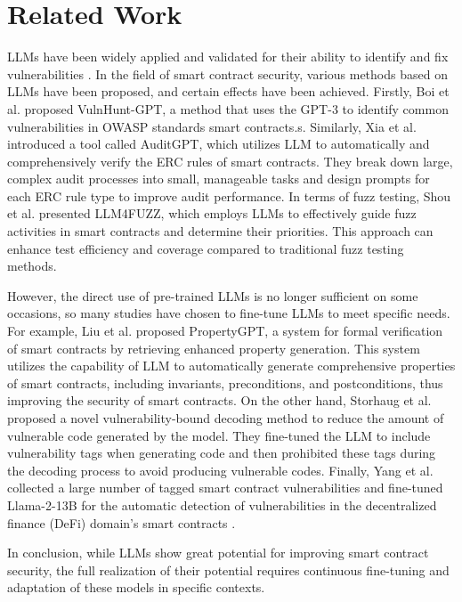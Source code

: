 \section{Related Work}
LLMs have been widely applied and validated for their ability to identify and fix vulnerabilities \cite{Napoli_2023_Evaluating}. In the field of smart contract security, various methods based on LLMs have been proposed, and certain effects have been achieved.
Firstly, Boi et al. \cite{Boi_2024_VulnHunt-GPT} proposed VulnHunt-GPT, a method that uses the GPT-3 to identify common vulnerabilities in OWASP standards smart contracts.s. Similarly, Xia et al. \cite{Xia_2024_AuditGPT} introduced a tool called AuditGPT, which utilizes LLM to automatically and comprehensively verify the ERC rules of smart contracts. They break down large, complex audit processes into small, manageable tasks and design prompts for each ERC rule type to improve audit performance. 
In terms of fuzz testing, Shou et al. \cite{Shou_2024_LLM4Fuzz} presented LLM4FUZZ, which employs LLMs to effectively guide fuzz activities in smart contracts and determine their priorities. This approach can enhance test efficiency and coverage compared to traditional fuzz testing methods.

However, the direct use of pre-trained LLMs is no longer sufficient on some occasions, so many studies have chosen to fine-tune LLMs to meet specific needs. For example, Liu et al. \cite{Liu_2024_PropertyGPT} proposed PropertyGPT,  a system for formal verification of smart contracts by retrieving enhanced property generation. This system utilizes the capability of LLM to automatically generate comprehensive properties of smart contracts, including invariants, preconditions, and postconditions, thus improving the security of smart contracts. On the other hand, Storhaug et al. \cite{Storhaug_2023_Efficient} proposed a novel vulnerability-bound decoding method to reduce the amount of vulnerable code generated by the model. They fine-tuned the LLM to include vulnerability tags when generating code and then prohibited these tags during the decoding process to avoid producing vulnerable codes. Finally, Yang et al. \cite{Yang_2024_Automated} collected a large number of tagged smart contract vulnerabilities and fine-tuned Llama-2-13B for the automatic detection of vulnerabilities in the decentralized finance (DeFi) domain's smart contracts \cite{li2024defitail}.

In conclusion, while LLMs show great potential for improving smart contract security, the full realization of their potential requires continuous fine-tuning and adaptation of these models in specific contexts.